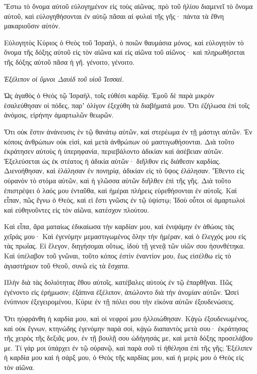 \begin{spacing}{1.1}
\begin{multicols}{2}
Ἔστω τὸ ὄνομα αὐτοῦ εὐλογημένον εἰς τοὺς αἰῶνας, πρὸ τοῦ ἡλίου διαμενεῖ τὸ ὄνομα αὐτοῦ, καὶ εὐλογηθήσονται ἐν αὐτῷ πᾶσαι αἱ φυλαὶ τῆς γῆς· πάντα τὰ ἔθνη μακαριοῦσιν αὐτόν.

Εὐλογητὸς Κύριος ὁ Θεὸς τοῦ Ἰσραὴλ, ὁ ποιῶν θαυμάσια μόνος,
καὶ εὐλογητὸν τὸ ὄνομα τῆς δόξης αὐτοῦ εἰς τὸν αἰῶνα καὶ εἰς αἰῶνα τοῦ αἰῶνος· καὶ πληρωθήσεται τῆς δόξης αὐτοῦ πᾶσα ἡ γῆ. γένοιτο, γένοιτο.

\textit{Ἐξέλιπον οἱ ὕμνοι Δαυὶδ τοῦ υἱοῦ Ἰεσσαί.}

Ὡς ἀγαθὸς ὁ Θεὸς τῷ Ἰσραὴλ, τοῖς εὐθέσι καρδίᾳ.
Ἐμοῦ δὲ παρὰ μικρὸν ἐσαλεύθησαν οἱ πόδες, παρʼ ὀλίγον ἐξεχύθη τὰ διαβήματά μου.
Ὅτι ἐζήλωσα ἐπὶ τοῖς ἀνόμοις, εἰρήνην ἁμαρτωλῶν θεωρῶν.

Ὅτι οὐκ ἔστιν ἀνάνευσις ἐν τῷ θανάτῳ αὐτῶν, καὶ στερέωμα ἐν τῇ μάστιγι αὐτῶν.
Ἐν κόποις ἀνθρώπων οὐκ εἰσὶ, καὶ μετὰ ἀνθρώπων οὐ μαστιγωθήσονται.
Διὰ τοῦτο ἐκράτησεν αὐτοὺς ἡ ὑπερηφανία, περιεβάλοντο ἀδικίαν καὶ ἀσέβειαν αὐτῶν.
Ἐξελεύσεται ὡς ἐκ στέατος ἡ ἀδικία αὐτῶν· διῆλθον εἰς διάθεσιν καρδίας.
Διενοήθησαν, καὶ ἐλάλησαν ἐν πονηρίᾳ, ἀδικίαν εἰς τὸ ὕψος ἐλάλησαν.
Ἔθεντο εἰς οὐρανὸν τὸ στόμα αὐτῶν, καὶ ἡ γλῶσσα αὐτῶν διῆλθεν ἐπὶ τῆς γῆς.
Διὰ τοῦτο ἐπιστρέψει ὁ λαός μου ἐνταῦθα, καὶ ἡμέραι πλήρεις εὑρεθήσονται ἐν αὐτοῖς.
Καὶ εἶπαν, πῶς ἔγνω ὁ Θεὸς, καὶ εἰ ἔστι γνῶσις ἐν τῷ ὑψίστῳ;
Ἰδοὺ οὗτοι οἱ ἁμαρτωλοὶ καὶ εὐθηνοῦντες εἰς τὸν αἰῶνα, κατέσχον πλούτου.

Καὶ εἶπα, ἄρα ματαίως ἐδικαίωσα τὴν καρδίαν μου, καὶ ἐνιψάμην ἐν ἀθώοις τὰς χεῖράς μου·
Καὶ ἐγενόμην μεμαστιγωμένος ὅλην τὴν ἡμέραν, καὶ ὁ ἔλεγχός μου εἰς τὰς πρωΐας.
Εἰ ἔλεγον, διηγήσομαι οὕτως, ἰδοὺ τῇ γενεᾷ τῶν υἱῶν σου ἠσυνθέτηκα.
Καὶ ὑπέλαβον τοῦ γνῶναι, τοῦτο κόπος ἐστὶν ἐναντίον μου,
ἕως εἰσέλθω εἰς τὸ ἁγιαστήριον τοῦ Θεοῦ, συνῶ εἰς τὰ ἔσχατα.

Πλὴν διὰ τὰς δολιότητας ἔθου αὐτοῖς, κατέβαλες αὐτοὺς ἐν τῷ ἐπαρθῆναι.
Πῶς ἐγένοντο εἰς ἐρήμωσιν; ἐξάπινα ἐξέλιπον, ἀπώλοντο διὰ τὴν ἀνομίαν αὐτῶν.
Ὡσεὶ ἐνύπνιον ἐξεγειρομένου, Κύριε ἐν τῇ πόλει σου τὴν εἰκόνα αὐτῶν ἐξουδενώσεις.

Ὅτι ηὐφράνθη ἡ καρδία μου, καὶ οἱ νεφροί μου ἠλλοιώθησαν.
Κᾀγὼ ἐξουδενωμένος, καὶ οὐκ ἔγνων, κτηνώδης ἐγενόμην παρὰ σοὶ,
κᾀγὼ διαπαντὸς μετὰ σου· ἐκράτησας τῆς χειρὸς τῆς δεξιᾶς μου,
ἐν τῇ βουλῇ σου ὡδήγησάς με, καὶ μετὰ δόξης προσελάβου με.
Τί γάρ μοι ὑπάρχει ἐν τῷ οὐρανῷ, καὶ παρὰ σοῦ τί ἠθέλησα ἐπὶ τῆς γῆς;
Ἐξέλιπεν ἡ καρδία μου καὶ ἡ σάρξ μου, ὁ Θεὸς τῆς καρδίας μου, καὶ ἡ μερίς μου ὁ Θεὸς εἰς τὸν αἰῶνα.


\end{multicols}
\end{spacing}
